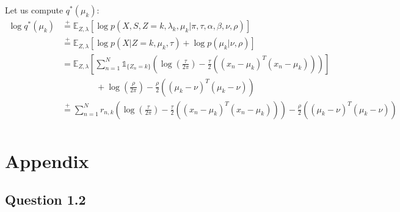 \documentclass{article}
\begin{document}
\noindent Let us compute $q^*(\mu_k)$:
\begin{equation}
  \begin{split}
    \log q^*(\mu_k) & \overset{+}{=} \mathbb{E}_{Z,\lambda}[\log p(X,S,Z = k,\lambda_k,\mu_k|\pi,\tau,\alpha,\beta,\nu,\rho)]                                                                                                  \\
                    & \overset{+}{=} \mathbb{E}_{Z,\lambda}[\log p(X|Z = k,\mu_k,\tau) + \log p(\mu_k|\nu,\rho)]                                                                                                               \\
                    & = \mathbb{E}_{Z,\lambda}\left[\sum_{n=1}^{N}\mathbb{1}_{\{Z_n = k\}}\left(\log \left(\frac{\tau}{2\pi}\right) -\frac{\tau}{2}\left((x_n - \mu_k)^T(x_n - \mu_k)\right)\right)\right]                     \\
                    & \qquad\qquad + \log \left(\frac{\rho}{2\pi}\right) - \frac{\rho}{2}\left((\mu_k - \nu)^T(\mu_k - \nu)\right)                                                                                             \\
                    & \overset{+}{=} \sum_{n=1}^{N}r_{n,k}\left(\log \left(\frac{\tau}{2\pi}\right) - \frac{\tau}{2}\left((x_n - \mu_k)^T(x_n - \mu_k)\right)\right) - \frac{\rho}{2}\left((\mu_k - \nu)^T(\mu_k - \nu)\right) \\
  \end{split}
\end{equation}

\newpage
\appendix

\section{Appendix}
\subsection{Question 1.2}\label{appendix:code.1.2}

\end{document}
